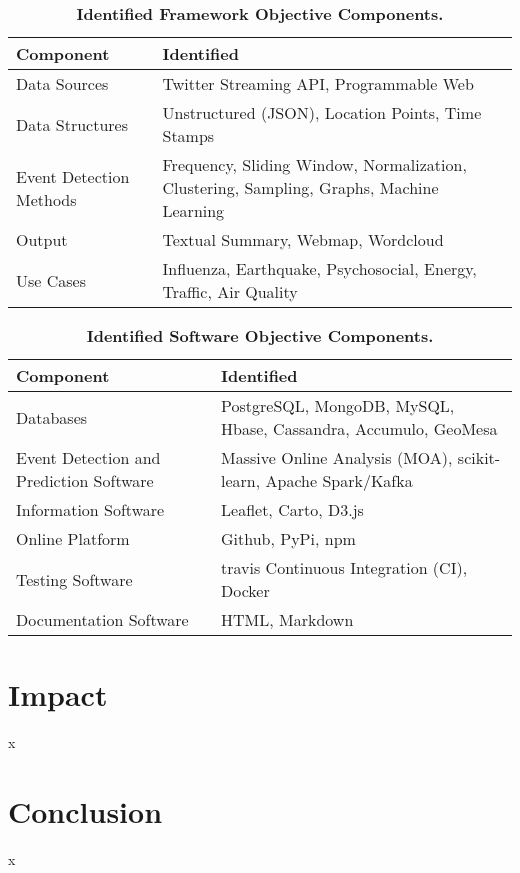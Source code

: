 \begin{table}
\centering
\caption{\textbf{Identified Framework Objective Components.}}
\label{table:frameworkcomponents}
\begin{tabular}{|p{2in}|p{4in}|}
\hline
\textbf{Component} & \textbf{Identified} \\ \hline
Data Sources & Twitter Streaming API, Programmable Web \\ \hline
Data Structures & Unstructured (JSON), Location Points, Time Stamps \\ \hline
Event Detection Methods & Frequency, Sliding Window, Normalization, Clustering, Sampling, Graphs, Machine Learning \\ \hline
Output & Textual Summary, Webmap, Wordcloud \\ \hline
Use Cases & Influenza, Earthquake, Psychosocial, Energy, Traffic, Air Quality \\ \hline
\end{tabular}
\end{table}

\begin{table}
\centering
\caption{\textbf{Identified Software Objective Components.}}
\label{table:softwarecomponents}
\begin{tabular}{|p{2in}|p{4in}|}
\hline
\textbf{Component} & \textbf{Identified} \\ \hline
Databases & PostgreSQL, MongoDB, MySQL, Hbase, Cassandra, Accumulo, GeoMesa \\ \hline
Event Detection and Prediction Software & Massive Online Analysis (MOA), scikit-learn, Apache Spark/Kafka \\ \hline
Information Software & Leaflet, Carto, D3.js \\ \hline
Online Platform & Github, PyPi, npm \\ \hline
Testing Software & travis Continuous Integration (CI), Docker \\ \hline
Documentation Software & HTML, Markdown \\ \hline
\end{tabular}
\end{table}




\section{Impact} \label{impact}

x




\section{Conclusion} \label{conclusion}

x

